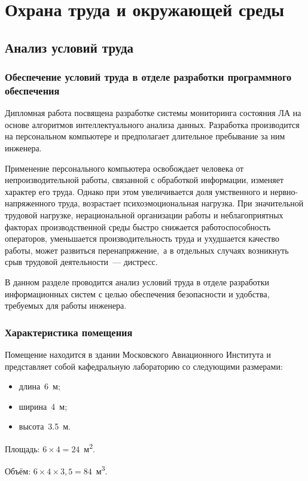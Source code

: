 \chapter{Охрана труда и окружающей среды}
\section{Анализ условий труда}
\subsection{Обеспечение условий труда в отделе разработки программного обеспечения}
Дипломная работа посвящена разработке системы мониторинга состояния ЛА на основе алгоритмов интеллектуального анализа данных. Разработка производится на персональном компьютере и предполагает длительное пребывание за ним инженера.

Применение персонального компьютера освобождает человека от непроизводительной работы, связанной с обработкой информации, изменяет характер его труда. Однако при этом увеличивается доля умственного и нервно-напряженного труда, возрастает психоэмоциональная нагрузка. При значительной трудовой нагрузке, нерациональной организации работы и неблагоприятных факторах производственной среды быстро снижается работоспособность операторов, уменьшается производительность труда и ухудшается качество работы, может развиться перенапряжение,~а в отдельных случаях возникнуть срыв трудовой деятельности~--- дистресс.

В данном разделе проводится анализ условий труда в отделе разработки информационных систем с целью обеспечения безопасности и удобства, требуемых для работы инженера.

\subsection{Характеристика помещения}
Помещение находится в здании Московского Авиационного Института и представляет собой кафедральную лабораторию со следующими размерами:
\begin{itemize}
	\item длина~6~м;
	\item ширина~4~м;
	\item высота~3.5~м.
\end{itemize}

Площадь: $6\times4 = 24$~м\textsuperscript{2}.

Объём: $6\times4\times3,5 = 84$~м\textsuperscript{3}.

